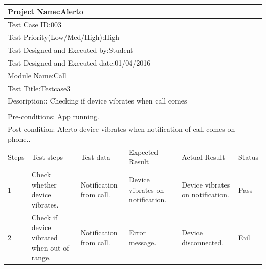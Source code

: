 \documentclass[12pt,a4paper]{report}
\begin{document}
\begin{table}[!h]
	
	\begin{tabular}{|p{0.8cm}|p{2.5cm}|p{3cm}|p{3cm}|p{3cm}|p{2.2cm}|}
		\hline
		\multicolumn{6}{|l|}{Project Name:Alerto}\\
		\hline
		\multicolumn{6}{|l|}{Test Case ID:003}\\
		\hline
		\multicolumn{6}{|l|}{Test Priority(Low/Med/High):High} \\ 
		\hline
		\multicolumn{6}{|l|}{Test Designed and Executed by:Student}\\
		\hline
		\multicolumn{6}{|l|}{Test Designed and Executed date:01/04/2016}\\
		\hline
		\multicolumn{6}{|l|}{Module Name:Call} \\ 
		\hline
		\multicolumn{6}{|l|}{Test Title:Testcase3} \\
		\hline
		\multicolumn{6}{|l|}{Description:: Checking if device vibrates when call comes} \\
		\hline
		\\
		\hline
		\multicolumn{6}{|l|}{Pre-conditions: App running.}\\
		\hline
		\multicolumn{6}{|l|}{Post condition: Alerto device vibrates when notification of call comes on phone..}\\
		\hline
		Steps & Test steps & Test data & Expected Result & Actual Result & Status \\ 
		\hline
		1&	Check whether device vibrates.&	Notification from call.&	Device vibrates on notification.&	Device vibrates on notification.&	Pass\\
		\hline
		2&	Check if device vibrated when out of range.&	Notification from call.&	Error message.&	Device disconnected.&	Fail\\
		
		\hline
	\end{tabular}
\end{table}
\end{document}
